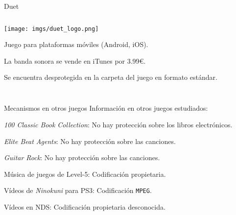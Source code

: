 \begin{frame}{Duet}
\begin{columns}
    \begin{column}{0.75\textwidth}
    \begin{center}\texttt{[image: imgs/duet\_logo.png]}\end{center}

    \begin{wideitemize}
        \item<1-> Juego para plataformas móviles (Android, iOS).

        \item<2-> La banda sonora se vende en iTunes por 3.99€.

        \item<3-> Se encuentra desprotegida en la carpeta del juego en formato estándar.
    \end{wideitemize}
    \end{column}

    \begin{column}{0.25\textwidth}
        \centering
    \end{column}
\end{columns}
\end{frame}

\subsection{}
\begin{frame}{Mecanismos en otros juegos}
Información en otros juegos estudiados:

\begin{wideitemize}
    \item<+-> \textit{100 Classic Book Collection}: No hay protección sobre los libros electrónicos.

    \item<+-> \textit{Elite Beat Agents}: No hay protección sobre las canciones.

    \item<+-> \textit{Guitar Rock}: No hay protección sobre las canciones.

    \item<+-> Música de juegos de Level-5: Codificación propietaria.

    \item<+-> Vídeos de \textit{Ninokuni} para PS3: Codificación \texttt{MPEG}.

    \item<+-> Vídeos en NDS: Codificación propietaria desconocida.
\end{wideitemize}
\end{frame}
